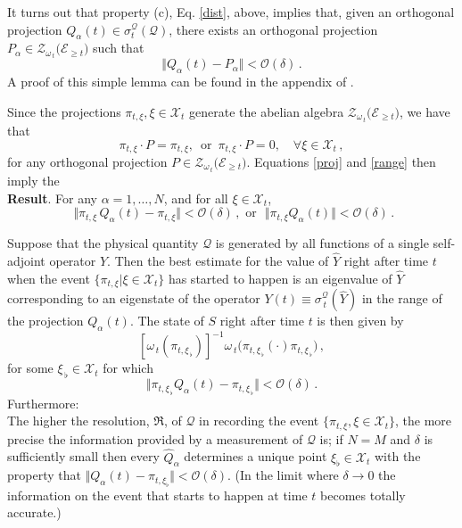 \documentclass[12pt]{article}
\begin{document}
\begin{enumerate}
{It turns out that property (c), Eq. \eqref{dist}, above, implies that, given an orthogonal projection
 $Q_{\alpha}(t) \in \sigma_{t}^{\mathcal{Q}}(\mathcal{Q})$, there exists an orthogonal projection 
 \mbox{$P_{\alpha} \in \mathcal{Z}_{\omega_{\,t}}\big( \mathcal{E}_{\geq t} \big)$} such that
 \begin{equation} \label{proj}
 \Vert Q_{\alpha}(t) - P_{\alpha} \Vert < \mathcal{O}(\delta)\,.
 \end{equation}
 A proof of this simple lemma can be found in the appendix of \cite{FS-Vienna}.
 
 Since the projections $\pi_{t,\xi}, \xi \in \mathcal{X}_t$ generate the abelian algebra $\mathcal{Z}_{\omega_{\,t}}\big(\mathcal{E}_{\geq t}\big)$, we have that 
 \begin{equation}\label{range}
 \pi_{t, \xi}\cdot P = \pi_{t, \xi} , \, \text{ or }\, \pi_{t,\xi}\cdot P =0, \quad \forall \xi \in \mathcal{X}_t\,, 
 \end{equation}
 for any orthogonal projection $P\in \mathcal{Z}_{\omega_{\,t}}\big(\mathcal{E}_{\geq t}\big)$.
Equations \eqref{proj} and \eqref{range} then imply the \vspace{0.2cm}\\
{\bf{Result}}.
For any $\alpha =1,\dots, N$, and for all $\xi \in \mathcal{X}_{t}$, 
$$\boxed{ \,\,\Vert \pi_{t, \xi} \, Q_{\alpha}(t) - \pi_{t, \xi} \Vert < \mathcal{O}(\delta)\,, \,\, \text{or  }\,\, \Vert \pi_{t, \xi} Q_{\alpha}(t) \Vert < \mathcal{O}(\delta)\,.}$$

Suppose that the physical quantity $\mathcal{Q}$ is generated by all functions of a single self-adjoint operator $\hat{Y}$. Then the best estimate for the value of $\hat{Y}$ right after time $t$ when the event 
$\lbrace \pi_{t,\xi} \vert \xi \in \mathcal{X}_{t} \rbrace$ has started to happen is an eigenvalue of $\hat{Y}$ corresponding to an eigenstate of the operator $Y(t)\equiv \sigma_{\,t}^{\mathcal{Q}}(\hat{Y})$ in the range of the projection $Q_{\alpha}(t)$. The state of $S$ right after time $t$ is then given by 
$$[\omega_{\,t}(\pi_{t, \xi_{\,\flat}})]^{-1} \omega_{\,t}\big( \pi_{t,\xi_{\,\flat}} (\cdot) \pi_{t,\xi_{\,\flat}}\big)\,,$$
for some $\xi_{\,\flat} \in \mathcal{X}_{t}$ for which 
\begin{equation} \label{recording}
\Vert \pi_{t,\xi_{\,\flat}} Q_{\alpha}(t) - \pi_{t, \xi_{\,\flat}} \Vert < \mathcal{O}(\delta)\,.
\end{equation}
Furthermore:\\
The higher the resolution, $\mathfrak{R}$, of $\mathcal{Q}$ in recording the event
$\lbrace \pi_{t,\xi}, \xi \in \mathcal{X}_{t}\rbrace$, the more precise the information provided by a measurement of $\mathcal{Q}$ is; if $N=M$ and 
$\delta$ is sufficiently small then every $\widehat{Q}_{\alpha}$ determines a unique point $\xi_{\flat} \in \mathcal{X}_t$ with the property that $\Vert Q_{\alpha}(t) - \pi_{t, \xi_{\flat}} \Vert < \mathcal{O}(\delta)$. (In the limit where $\delta \rightarrow 0$ the information on the event that starts to happen at time $t$ becomes totally accurate.)

}
\end{enumerate}
\end{document}
